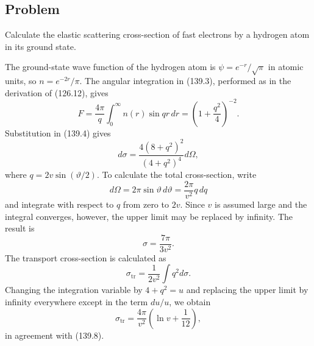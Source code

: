 \subsection*{Problem}

\ProblemHeading Calculate the elastic scattering cross-section of fast
electrons by a hydrogen atom in its ground state.

\SolutionHeading The ground-state wave function of the hydrogen atom is
$\psi=e^{-r}/\sqrt\pi$ in atomic units, so $n=e^{-2r}/\pi$. The angular
integration in (139.3), performed as in the derivation of (126.12), gives
\[
 F=\frac{4\pi}{q}\int_0^\infty n(r)\sin qr\,dr
 =\left(1+\frac{q^2}{4}\right)^{-2}.
\]
Substitution in (139.4) gives
\[
 d\sigma=\frac{4(8+q^2)^2}{(4+q^2)^4}d\Omega,
\]
where $q=2v\sin(\vartheta/2)$. To calculate the total cross-section, write
\[
 d\Omega=2\pi\sin\vartheta\,d\vartheta=\frac{2\pi}{v^2}q\,dq
\]
and integrate with respect to $q$ from zero to $2v$. Since $v$ is assumed
large and the integral converges, however, the upper limit may be replaced by
infinity. The result is
\[
 \sigma=\frac{7\pi}{3v^2}.
\]
The transport cross-section is calculated as
\[
 \sigma_{\mathrm{tr}}=\frac1{2v^2}\int q^2d\sigma.
\]
Changing the integration variable by $4+q^2=u$ and replacing the upper limit
by infinity everywhere except in the term $du/u$, we obtain
\[
 \sigma_{\mathrm{tr}}=\frac{4\pi}{v^2}\left(\ln v+\frac1{12}\right),
\]
in agreement with (139.8).
